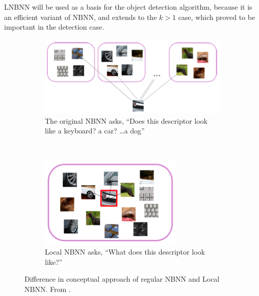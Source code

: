 LNBNN will be used as a basis for the object detection algorithm, because it is an efficient variant of NBNN, and extends to the $k>1$ case, which proved to be important in the detection case.

\begin{figure}[hbt]
    \centering
    \begin{subfigure}[b]{0.60\textwidth}
        \centering
        \includegraphics[width=\textwidth]{LNBNNa}
        \caption{The original NBNN asks, ``Does this descriptor look like a keyboard? a car? \ldots a dog''}
        \label{fig:lnbnna}
    \end{subfigure}%
    ~ %
    \begin{subfigure}[b]{0.30\textwidth}
        \centering
        \includegraphics[width=\textwidth]{LNBNNb}
        \caption{Local NBNN asks, ``What does this descriptor look like?''}
        \label{fig:lnbnnb}
    \end{subfigure}%
    \caption{Difference in conceptual approach of regular NBNN and Local NBNN. From \cite{mccann2012local}.}
    \label{fig:lnbnn}
\end{figure}



